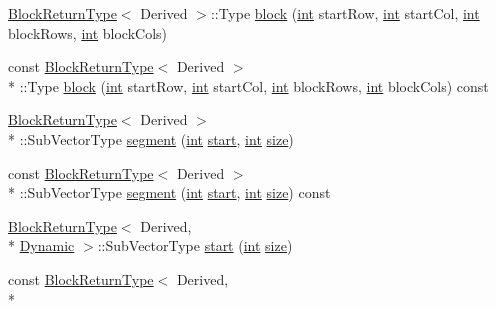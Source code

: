 \begin{DoxyCompactItemize}
\item 
\hyperlink{struct_block_return_type}{Block\-Return\-Type}$<$ Derived $>$\-::Type \hyperlink{class_matrix_base_aadc9ed607e34a3c3271481c06ad07213}{block} (\hyperlink{ioapi_8h_a787fa3cf048117ba7123753c1e74fcd6}{int} start\-Row, \hyperlink{ioapi_8h_a787fa3cf048117ba7123753c1e74fcd6}{int} start\-Col, \hyperlink{ioapi_8h_a787fa3cf048117ba7123753c1e74fcd6}{int} block\-Rows, \hyperlink{ioapi_8h_a787fa3cf048117ba7123753c1e74fcd6}{int} block\-Cols)
\item 
const \hyperlink{struct_block_return_type}{Block\-Return\-Type}$<$ Derived $>$\\*
\-::Type \hyperlink{class_matrix_base_a0c124fed821e54ace810c5a6a46bfcaf}{block} (\hyperlink{ioapi_8h_a787fa3cf048117ba7123753c1e74fcd6}{int} start\-Row, \hyperlink{ioapi_8h_a787fa3cf048117ba7123753c1e74fcd6}{int} start\-Col, \hyperlink{ioapi_8h_a787fa3cf048117ba7123753c1e74fcd6}{int} block\-Rows, \hyperlink{ioapi_8h_a787fa3cf048117ba7123753c1e74fcd6}{int} block\-Cols) const 
\item 
\hyperlink{struct_block_return_type}{Block\-Return\-Type}$<$ Derived $>$\\*
\-::Sub\-Vector\-Type \hyperlink{class_matrix_base_ac4563c9292a7fd3fd0278061aec01051}{segment} (\hyperlink{ioapi_8h_a787fa3cf048117ba7123753c1e74fcd6}{int} \hyperlink{glext_8h_a13be19455586e95d5a42ed8f054afad2}{start}, \hyperlink{ioapi_8h_a787fa3cf048117ba7123753c1e74fcd6}{int} \hyperlink{glext_8h_a014d89bd76f74ef3a29c8f04b473eb76}{size})
\item 
const \hyperlink{struct_block_return_type}{Block\-Return\-Type}$<$ Derived $>$\\*
\-::Sub\-Vector\-Type \hyperlink{class_matrix_base_a3d3e13bf3c829d13ead1bb5371cf3ff8}{segment} (\hyperlink{ioapi_8h_a787fa3cf048117ba7123753c1e74fcd6}{int} \hyperlink{glext_8h_a13be19455586e95d5a42ed8f054afad2}{start}, \hyperlink{ioapi_8h_a787fa3cf048117ba7123753c1e74fcd6}{int} \hyperlink{glext_8h_a014d89bd76f74ef3a29c8f04b473eb76}{size}) const 
\item 
\hyperlink{struct_block_return_type}{Block\-Return\-Type}$<$ Derived, \\*
\hyperlink{_constants_8h_adc9da5be31bdce40c25a92c27999c0e3}{Dynamic} $>$\-::Sub\-Vector\-Type \hyperlink{class_matrix_base_ab36913719fa1dacbb9bf82ce85edf3dc}{start} (\hyperlink{ioapi_8h_a787fa3cf048117ba7123753c1e74fcd6}{int} \hyperlink{glext_8h_a014d89bd76f74ef3a29c8f04b473eb76}{size})
\item 
const \hyperlink{struct_block_return_type}{Block\-Return\-Type}$<$ Derived, \\*

\end{DoxyCompactItemize}
